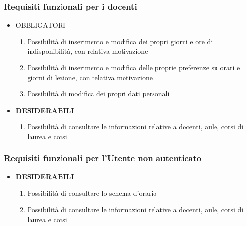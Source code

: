 \documentclass[11pt,a4paper]{article}
\begin{document}
\subsubsection{Requisiti funzionali per i docenti}
\begin{itemize}
\item \textsc{OBBLIGATORI}
\begin{enumerate}
\item Possibilità di inserimento e modifica dei propri giorni e ore di indisponibilità, con relativa motivazione
\item Possibilità di inserimento e modifica delle proprie preferenze su orari e giorni di lezione, con relativa motivazione
\item Possibilità di modifica dei propri dati personali
\end{enumerate}
\item \textbf{DESIDERABILI}
\begin{enumerate}
\item Possibilità di consultare le informazioni relative a docenti, aule, corsi di laurea e corsi
\end{enumerate}
\end{itemize}
\subsubsection{Requisiti funzionali per l'Utente non autenticato}
\begin{itemize}
\item \textbf{DESIDERABILI}
\begin{enumerate}
\item Possibilità di consultare lo schema d'orario
\item Possibilità di consultare le informazioni relative a docenti, aule, corsi di laurea e corsi
\end{enumerate}
\end{itemize}
\end{document}
